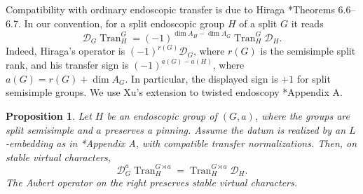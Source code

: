 \documentclass[12pt]{amsart}
\theoremstyle{definition}
\theoremstyle{plain}
\newtheorem{proposition}[definition]{Proposition}
\theoremstyle{remark}
\numberwithin{equation}{section}
\begin{document}
Compatibility with ordinary endoscopic transfer is due to Hiraga
\cite{Hiraga2004-FunctorialityZelevinskiInvolutions}*{Theorems 6.6--6.7}.
In our convention, for a split endoscopic group $H$
of a split $G$ it reads
\[
 \mathcal D_G\operatorname{Tran}_H^G
   =(-1)^{\dim A_H-\dim A_G}
       \operatorname{Tran}_H^G\mathcal D_H.
\]
Indeed, Hiraga's operator is $(-1)^{r(G)}\mathcal D_G$, where
$r(G)$ is the semisimple split rank, and his transfer sign is
$(-1)^{a(G)-a(H)}$, where $a(G)=r(G)+\dim A_G$.
In particular, the displayed sign is $+1$ for split semisimple
groups. 
We use Xu's extension to twisted endoscopy
\cite{Xu2017-MoeglinParametrizationArthurPackets}*{Appendix A}.

\begin{proposition}\label{prop:Xu-transfer}
Let $H$ be an endoscopic group of $(G, a)$, where the groups
are split semisimple and $a$ preserves a pinning. Assume the
datum is realized by an $L$-embedding as in
\cite{Xu2017-MoeglinParametrizationArthurPackets}*{Appendix A}, with
compatible transfer normalizations. Then, on stable virtual characters,
\begin{equation}\label{eq:Xu-transfer}
 \mathcal D_G^a\operatorname{Tran}_H^{G \rtimes a}
   =\operatorname{Tran}_H^{G \rtimes a}\mathcal D_H.
\end{equation}
The Aubert operator on the right preserves stable virtual characters.
\end{proposition}
\end{document}
